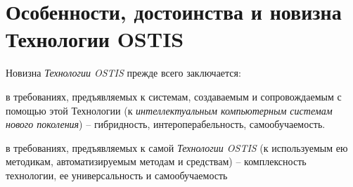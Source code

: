 \section*{Особенности, достоинства и новизна Технологии OSTIS}
\label{concl_novelty}
Новизна \textit{Технологии OSTIS} прежде всего заключается:
\begin{textitemize}
	\item в требованиях, предъявляемых к системам, создаваемым и сопровождаемым с помощью этой Технологии (к \textit{интеллектуальным компьютерным системам нового поколения}) -- гибридность, интероперабельность, самообучаемость.
	\item в требованиях, предъявляемых к самой \textit{Технологии OSTIS} (к используемым ею методикам, автоматизируемым методам и средствам) -- комплексность технологии, ее универсальность и самообучаемость
\end{textitemize}

